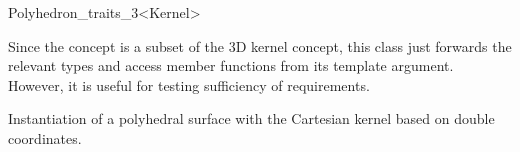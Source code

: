 \begin{ccRefClass}{Polyhedron_traits_3<Kernel>}

\ccSeeAlso


\ccImplementation

Since the  concept is a subset of the 3D
kernel concept, this class just forwards the relevant types and access
member functions from its template argument. However, it is useful
for testing sufficiency of requirements.

\ccExample

Instantiation of a polyhedral surface with the 
Cartesian kernel based on double coordinates. 


\end{ccRefClass}

\ccRefPageEnd

